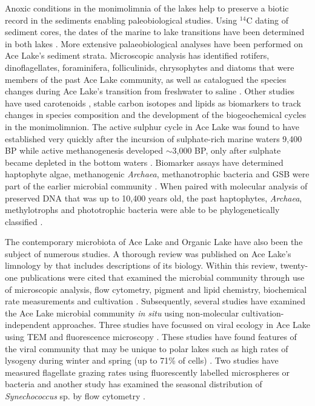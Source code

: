 Anoxic conditions in the monimolimnia of the lakes help to preserve a biotic record in the sediments enabling paleobiological studies.
Using $^{14}$C dating of sediment cores, the dates of the marine to lake transitions have been determined in both lakes \cite{Bird1991}.
More extensive palaeobiological analyses have been performed on Ace Lake's sediment strata.
Microscopic analysis has identified rotifers, dinoflagellates, foraminifera, folliculinids, chrysophytes and diatoms that were members of the past Ace Lake community, as well as catalogued the species changes during Ace Lake's transition from freshwater to saline \cite{Roberts1999, Swadling2001, Cromer2005}.
Other studies have used carotenoids \cite{Hopmans2005, Coolen2006}, stable carbon isotopes \cite{Schouten2001} and lipids \cite{Volkman1986, Volkman1988, Damste2001, Coolen2004a, Coolen2004b, Coolen2008} as biomarkers to track changes in species composition and the development of the biogeochemical cycles in the monimolimnion.
The active sulphur cycle in Ace Lake was found to have established very quickly after the incursion of sulphate-rich marine waters 9,400 BP while active methanogenesis developed $\sim$3,000 BP, only after sulphate became depleted in the bottom waters \cite{Coolen2004b, Coolen2006}.
Biomarker assays have determined haptophyte algae, methanogenic \emph{Archaea}, methanotrophic bacteria and \ac{GSB} were part of the earlier microbial community \cite{Schouten2001, Coolen2004a, Coolen2004b, Coolen2006, Coolen2008}.
When paired with molecular analysis of preserved \textsc{DNA} that was up to 10,400 years old, the past haptophytes, \emph{Archaea}, methylotrophs and phototrophic bacteria were able to be phylogenetically classified \cite{Coolen2004a, Coolen2004b, Coolen2006, Coolen2008}.

The contemporary microbiota of Ace Lake and Organic Lake have also been the subject of numerous studies.
A thorough review was published on Ace Lake's limnology by \citet{Rankin1999} that includes descriptions of its biology.
Within this review, twenty-one publications were cited that examined the microbial community through use of microscopic analysis, flow cytometry, pigment and lipid chemistry, biochemical rate measurements and cultivation \cite{Rankin1999}.
Subsequently, several studies have examined the Ace Lake microbial community \emph{in situ} using non-molecular cultivation-independent approaches.
Three studies have focussed on viral ecology in Ace Lake using \ac{TEM} and fluorescence microscopy \cite{Laybourn-Parry2001, Madan2005, Laybourn-Parry2007}.
These studies have found features of the viral community that may be unique to polar lakes such as high rates of lysogeny during winter and spring (up to 71\% of cells) \cite{Laybourn-Parry2007}.
Two studies have measured flagellate grazing rates using fluorescently labelled microspheres or bacteria \cite{Bell2003, Laybourn-Parry2005} and another study has examined the seasonal distribution of \emph{Synechococcus} sp. by flow cytometry \cite{Powell2005}.

